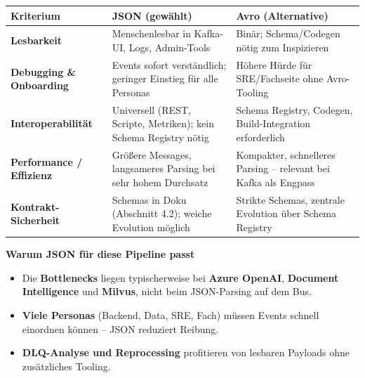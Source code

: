 {\def\LTcaptype{none} %
\begin{longtable}[]{@{}
  >{\raggedright\arraybackslash}p{}
  >{\raggedright\arraybackslash}p{}
  >{\raggedright\arraybackslash}p{}@{}}
\toprule\noalign{}
\begin{minipage}[b]{\linewidth}\raggedright
Kriterium
\end{minipage} & \begin{minipage}[b]{\linewidth}\raggedright
JSON (gewählt)
\end{minipage} & \begin{minipage}[b]{\linewidth}\raggedright
Avro (Alternative)
\end{minipage} \\
\midrule\noalign{}
\endhead
\bottomrule\noalign{}
\endlastfoot
\textbf{Lesbarkeit} & Menschenlesbar in Kafka-UI, Logs, Admin-Tools &
Binär; Schema/Codegen nötig zum Inspizieren \\
\textbf{Debugging \& Onboarding} & Events sofort verständlich; geringer
Einstieg für alle Personas & Höhere Hürde für SRE/Fachseite ohne
Avro-Tooling \\
\textbf{Interoperabilität} & Universell (REST, Scripte, Metriken); kein
Schema Registry nötig & Schema Registry, Codegen, Build-Integration
erforderlich \\
\textbf{Performance / Effizienz} & Größere Messages, langsameres Parsing
bei sehr hohem Durchsatz & Kompakter, schnelleres Parsing -- relevant
bei Kafka als Engpass \\
\textbf{Kontrakt-Sicherheit} & Schemas in Doku (Abschnitt 4.2); weiche
Evolution möglich & Strikte Schemas, zentrale Evolution über Schema
Registry \\
\end{longtable}
}

\textbf{Warum JSON für diese Pipeline passt}

\begin{itemize}
\tightlist
\item
  Die \textbf{Bottlenecks} liegen typischerweise bei \textbf{Azure
  OpenAI}, \textbf{Document Intelligence} und \textbf{Milvus}, nicht
  beim JSON-Parsing auf dem Bus.
\item
  \textbf{Viele Personas} (Backend, Data, SRE, Fach) müssen Events
  schnell einordnen können -- JSON reduziert Reibung.
\item
  \textbf{DLQ-Analyse und Reprocessing} profitieren von lesbaren
  Payloads ohne zusätzliches Tooling.
\end{itemize}


